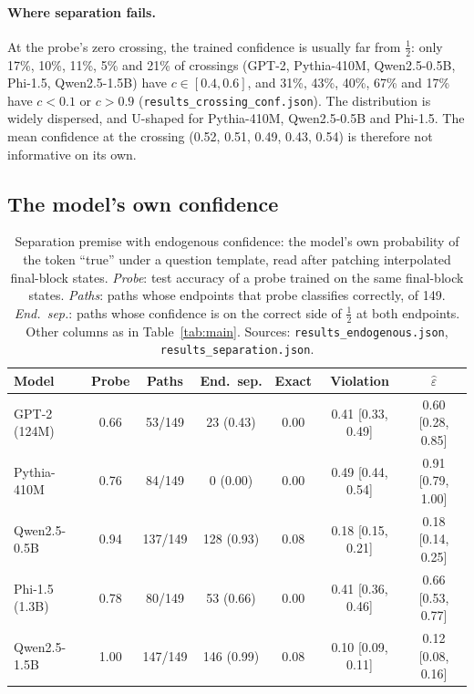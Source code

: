 \documentclass[10pt]{article}
\theoremstyle{definition}
\theoremstyle{remark}
\newcommand{\conf}{c}
\begin{document}
\paragraph{Where separation fails.}
At the probe's zero crossing, the trained confidence is usually far from
$\tfrac12$: only 17\%, 10\%, 11\%, 5\% and 21\% of crossings (GPT-2,
Pythia-410M, Qwen2.5-0.5B, Phi-1.5, Qwen2.5-1.5B) have
$\conf\in[0.4,0.6]$, and 31\%, 43\%, 40\%, 67\% and 17\% have $\conf<0.1$
or $\conf>0.9$ (\texttt{results\_crossing\_conf.json}). The distribution
is widely dispersed, and U-shaped for Pythia-410M, Qwen2.5-0.5B and
Phi-1.5. The mean confidence at the crossing (0.52, 0.51, 0.49, 0.43,
0.54) is therefore not informative on its own.

\subsection{The model's own confidence}
\label{sec:endo}

\begin{table}[t]
\centering
\caption{Separation premise with endogenous confidence: the model's own
probability of the token ``true'' under a question template, read after
patching interpolated final-block states. \emph{Probe}: test accuracy of a
probe trained on the same final-block states. \emph{Paths}: paths whose
endpoints that probe classifies correctly, of 149. \emph{End.\ sep.}:
paths whose confidence is on the correct side of $\tfrac12$ at both
endpoints. Other columns as in Table~\ref{tab:main}. Sources:
\texttt{results\_endogenous.json}, \texttt{results\_separation.json}.}
\label{tab:endo}
\footnotesize
\begin{tabular}{@{}lcccccc@{}}
\toprule
Model & Probe & Paths & End.\ sep. & Exact & Violation & $\hat\varepsilon$ \\
\midrule
GPT-2 (124M)   & 0.66 & 53/149  & 23 (0.43)  & 0.00 & 0.41 [0.33, 0.49] & 0.60 [0.28, 0.85] \\
Pythia-410M    & 0.76 & 84/149  & 0 (0.00)   & 0.00 & 0.49 [0.44, 0.54] & 0.91 [0.79, 1.00] \\
Qwen2.5-0.5B   & 0.94 & 137/149 & 128 (0.93) & 0.08 & 0.18 [0.15, 0.21] & 0.18 [0.14, 0.25] \\
Phi-1.5 (1.3B) & 0.78 & 80/149  & 53 (0.66)  & 0.00 & 0.41 [0.36, 0.46] & 0.66 [0.53, 0.77] \\
Qwen2.5-1.5B   & 1.00 & 147/149 & 146 (0.99) & 0.08 & 0.10 [0.09, 0.11] & 0.12 [0.08, 0.16] \\
\bottomrule
\end{tabular}
\end{table}
\end{document}
